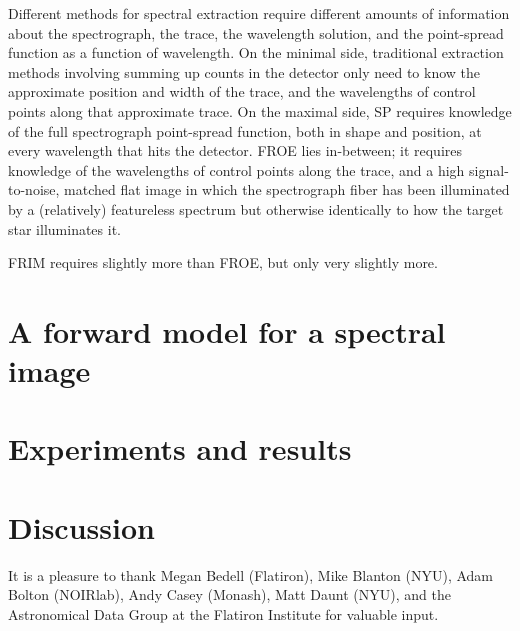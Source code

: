 \documentclass[modern]{aastex631}
\begin{document}
Different methods for spectral extraction require different amounts of information about the spectrograph, the trace, the wavelength solution, and the point-spread function as a function of wavelength.
On the minimal side, traditional extraction methods involving summing up counts in the detector only need to know the approximate position and width of the trace, and the wavelengths of control points along that approximate trace.
On the maximal side, SP requires knowledge of the full spectrograph point-spread function, both in shape and position, at every wavelength that hits the detector.
FROE lies in-between; it requires knowledge of the wavelengths of control points along the trace, and a high signal-to-noise, matched flat image in which the spectrograph fiber has been illuminated by a (relatively) featureless spectrum but otherwise identically to how the target star illuminates it.

FRIM requires slightly more than FROE, but only very slightly more.

\section{A forward model for a spectral image}

\section{Experiments and results}

\section{Discussion}

\begin{acknowledgments}
It is a pleasure to thank
Megan Bedell (Flatiron),
Mike Blanton (NYU),
Adam Bolton (NOIRlab),
Andy Casey (Monash),
Matt Daunt (NYU),
and the Astronomical Data Group at the Flatiron Institute for valuable input.
\end{acknowledgments}
\end{document}
